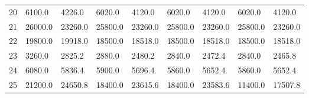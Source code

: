 \begin{tabular}{|r|l|l|l|l|l|l|l|l|}
  20 & 6100.0 & 4226.0 & 6020.0 & 4120.0 & 6020.0 & 4120.0 & 6020.0 & 4120.0 \\ 
  21 & 26000.0 & 23260.0 & 25800.0 & 23260.0 & 25800.0 & 23260.0 & 25800.0 & 23260.0 \\ 
  22 & 19800.0 & 19918.0 & 18500.0 & 18518.0 & 18500.0 & 18518.0 & 18500.0 & 18518.0 \\ 
  23 & 3260.0 & 2825.2 & 2880.0 & 2480.2 & 2840.0 & 2472.4 & 2840.0 & 2465.8 \\ 
  24 & 6080.0 & 5836.4 & 5900.0 & 5696.4 & 5860.0 & 5652.4 & 5860.0 & 5652.4 \\ 
  25 & 21200.0 & 24650.8 & 18400.0 & 23615.6 & 18400.0 & 23583.6 & 11400.0 & 17507.8 \\ 
\end{tabular}
